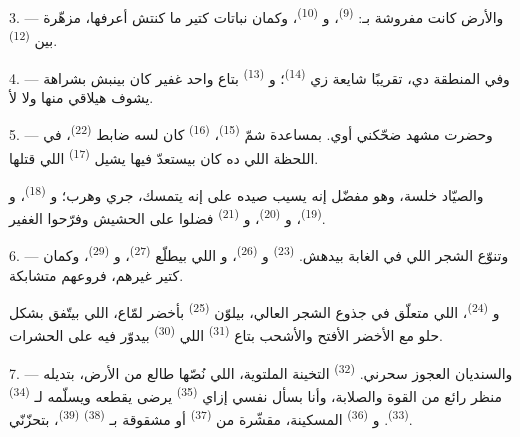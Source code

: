 3. --- والأرض كانت مفروشة بـ: 
\textsuperscript{(9)}، و \textsuperscript{(10)}، وكمان نباتات كتير ما
كنتش أعرفها، مزهّرة بين  \textsuperscript{(12)}.

4. --- وفي المنطقة دي،  تقريبًا شايعة زي 
\textsuperscript{(14)}؛ و \textsuperscript{(13)} بتاع واحد غفير كان
بينبش بشراهة يشوف هيلاقي منها ولا لأ.

\VUsaut{3.0mm}
\VUsaut{3.0mm}

5. --- وحضرت  مشهد ضحّكني أوي. بمساعدة شمّ  \textsuperscript{(15)}،  \textsuperscript{(16)} كان لسه ضابط
 \textsuperscript{(22)}، في اللحظة اللي ده كان بيستعدّ فيها يشيل
 \textsuperscript{(17)} اللي قتلها.

والصيّاد خلسة، وهو مفضّل إنه يسيب صيده على إنه يتمسك، جري وهرب؛ و \textsuperscript{(18)}، و \textsuperscript{(19)}،
و \textsuperscript{(20)}، و \textsuperscript{(21)}
فضلوا على الحشيش وفرّحوا الغفير.

6. --- وتنوّع الشجر اللي في الغابة بيدهش.  \textsuperscript{(23)}
و \textsuperscript{(26)}، و اللي بيطلّع
 \textsuperscript{(27)}، و \textsuperscript{(29)}، وكمان
كتير غيرهم، فروعهم متشابكة.

و \textsuperscript{(24)}، اللي متعلّق في جذوع الشجر العالي، بيلوّن
 \textsuperscript{(25)} بأخضر لمّاع، اللي بيتّفق بشكل حلو مع الأخضر
الأفتح والأشحب بتاع  \textsuperscript{(31)} اللي 
\textsuperscript{(30)} بيدوّر فيه على الحشرات.

\VUsaut{3.0mm}
\VUsaut{3.0mm}

7. --- والسنديان العجوز سحرني.  \textsuperscript{(32)} التخينة الملتوية،
اللي نُصّها طالع من الأرض، بتديله منظر رائع من القوة والصلابة، وأنا بسأل نفسي
إزاي  \textsuperscript{(35)} يرضى يقطعه ويسلّمه لـ
\textsuperscript{(34)}  \textsuperscript{(33)}. و
\textsuperscript{(36)} المسكينة، مقشّرة من  \textsuperscript{(37)} أو
مشقوقة بـ \textsuperscript{(38)} 
\textsuperscript{(39)}، بتحزّنّي.


